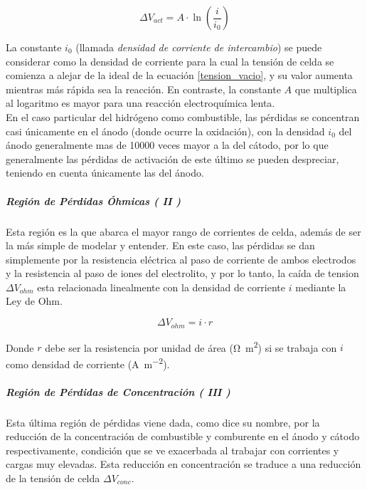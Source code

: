 \begin{equation}\label{perd_act}
    \Delta V_{act}=A\cdot \ln\left(\frac{i}{i_0}\right)
\end{equation}

La constante $i_0$ (llamada \textit{densidad de corriente de intercambio}) se puede considerar como la densidad de corriente para la cual la tensión de celda se comienza a alejar de la ideal de la ecuación \ref{tension_vacio}, y su valor aumenta mientras más rápida sea la reacción. En contraste, la constante $A$ que multiplica al logaritmo es mayor para una reacción electroquímica lenta.\\

En el caso particular del hidrógeno como combustible, las pérdidas se concentran casi únicamente en el ánodo (donde ocurre la oxidación), con la densidad $i_0$ del ánodo generalmente mas de \num{10000} veces mayor a la del cátodo, por lo que generalmente las pérdidas de activación de este último se pueden despreciar, teniendo en cuenta únicamente las del ánodo.\\

\subparagraph{Región de Pérdidas Óhmicas ( II )}

Esta región es la que abarca el mayor rango de corrientes de celda, además de ser la más simple de modelar y entender. En este caso, las pérdidas se dan simplemente por la resistencia eléctrica al paso de corriente de ambos electrodos y la resistencia al paso de iones del electrolito, y por lo tanto, la caída de tension $\Delta V_{ohm}$ esta relacionada linealmente con la densidad de corriente $i$ mediante la Ley de Ohm.

\begin{equation}\label{perd_ohm}
    \Delta V_{ohm}=i\cdot r
\end{equation}

Donde $r$ debe ser la resistencia por unidad de área (\unit{\ohm\metre\squared}) si se trabaja con $i$ como densidad de corriente (\unit{\ampere\per\metre\squared}).\\

\subparagraph{Región de Pérdidas de Concentración ( III )}
    
Esta última región de pérdidas viene dada, como dice su nombre, por la reducción de la concentración de combustible y comburente en el ánodo y cátodo respectivamente, condición que se ve exacerbada al trabajar con corrientes y cargas muy elevadas. Esta reducción en concentración se traduce a una reducción de la tensión de celda $\Delta V_{conc}$.\\

